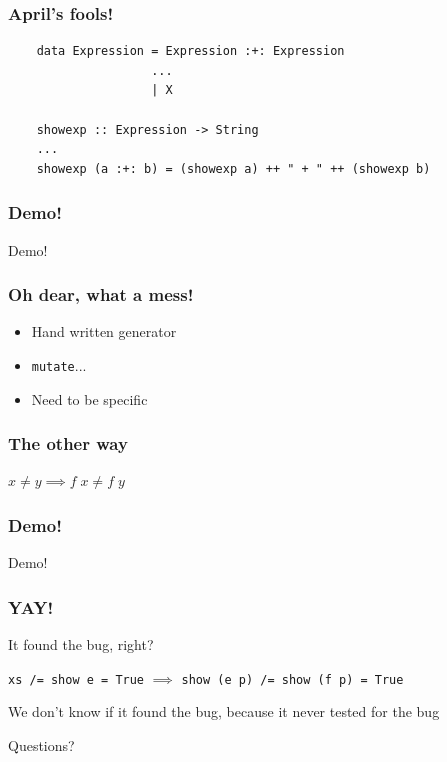 \documentclass{beamer}
\begin{document}
\begin{frame}[fragile]
    \frametitle{April's fools!}
    \begin{verbatim}
    data Expression = Expression :+: Expression
                    ...
                    | X

    showexp :: Expression -> String
    ...
    showexp (a :+: b) = (showexp a) ++ " + " ++ (showexp b)
    \end{verbatim}
\end{frame}

\begin{frame}
    \frametitle{Demo!}
        \Huge{\centerline{Demo!}}
\end{frame}

\begin{frame}
    \frametitle{Oh dear, what a mess!}
    \begin{itemize}
        \item Hand written generator
        \item \texttt{mutate}...
        \item Need to be specific
    \end{itemize}
\end{frame}

\begin{frame}
    \frametitle{The other way}
    \centerline{$x \neq y \implies f\;x\neq f\;y$} 
\end{frame}

\begin{frame}
    \frametitle{Demo!}
        \Huge{\centerline{Demo!}}
\end{frame}

\begin{frame}
    \frametitle{YAY!}
    \centerline{It found the bug, right?}
    \pause
    \centerline{}
    \centerline{\texttt{xs /= show e = True} $\implies$ \texttt{show (e p) /= show (f p) = True}}
    \centerline{}
    \centerline{We don't know if it found the bug, because it never tested for the bug}
\end{frame}

\begin{frame}
    \Huge{\centerline{Questions?}}
\end{frame}
\end{document}

